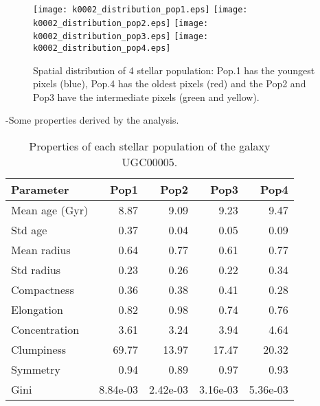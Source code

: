 \begin{figure}[bh]
\begin{center}
\texttt{[image: k0002\_distribution\_pop1.eps]}
\texttt{[image: k0002\_distribution\_pop2.eps]}
\texttt{[image: k0002\_distribution\_pop3.eps]}
\texttt{[image: k0002\_distribution\_pop4.eps]}
 \caption{Spatial distribution of 4 stellar population: Pop.1 has the youngest pixels (blue), Pop.4 has the oldest pixels (red) and the Pop2 and Pop3 have the intermediate pixels (green and yellow).}
   \label{fig1}
\end{center}
\end{figure}

-Some properties derived by the analysis.


\begin{table}[h]
\centering
\begin{tabular}{l|r|r|r|r}
Parameter & Pop1 & Pop2 & Pop3 & Pop4 \\\hline
Mean age (Gyr) & 8.87 & 9.09 & 9.23 & 9.47 \\
Std age & 0.37 & 0.04 & 0.05 & 0.09 \\
Mean radius & 0.64 & 0.77 & 0.61 & 0.77 \\
Std radius & 0.23 & 0.26 & 0.22 & 0.34\\
Compactness & 0.36 & 0.38 & 0.41 & 0.28 \\
Elongation & 0.82 & 0.98 & 0.74 & 0.76 \\
Concentration & 3.61 & 3.24 & 3.94 & 4.64 \\
Clumpiness & 69.77 & 13.97 & 17.47 & 20.32 \\
Symmetry & 0.94 & 0.89 & 0.97 & 0.93 \\
Gini & 8.84e-03 & 2.42e-03 & 3.16e-03 & 5.36e-03 \\
\end{tabular}
\caption{\label{tab:widgets}Properties of each stellar population of the galaxy UGC00005.}
\end{table}

